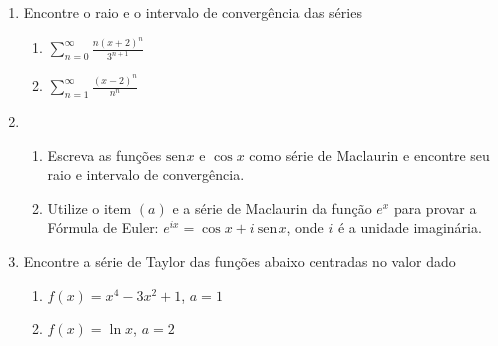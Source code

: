 \documentclass{article}
\newcommand{\ds}{\displaystyle}
\providecommand{\sin}{} \renewcommand{\sin}{\mathrm{sen}\hspace{1pt}}
\begin{document}
\begin{enumerate}
\item Encontre o raio e o intervalo de converg\^encia das s\'eries
	\begin{enumerate}
		\item $\ds\sum_{n=0}^\infty \frac{n(x+2)^n}{3^{n+1}}$
		\item $\ds\sum_{n=1}^\infty \frac{(x-2)^n}{n^n}$
	\end{enumerate}

\item
	\begin{enumerate}
		\item Escreva as fun\c{c}\~oes $\sin x$ e $\cos x$ como s\'erie de Maclaurin e encontre seu raio e intervalo de converg\^encia.
		\item Utilize o item $(a)$ e a s\'erie de Maclaurin da fun\c{c}\~ao $e^x$ para provar a F\'ormula de Euler: $e^{ix} = \cos x + i\ \sin x$, onde $i$ \'e a unidade imagin\'aria.
	\end{enumerate}

\item Encontre a s\'erie de Taylor das fun\c{c}\~oes abaixo centradas no valor dado
	\begin{enumerate}
		\item $f(x) = x^4 - 3x^2 + 1$, $a = 1$
		\item $f(x) = \ln x$, $a = 2$
	\end{enumerate}

\end{enumerate}
\end{document}
